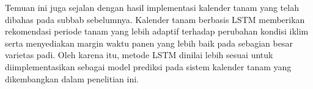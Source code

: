 Temuan ini juga sejalan dengan hasil implementasi kalender tanam yang telah dibahas pada subbab sebelumnya. Kalender tanam berbasis LSTM memberikan rekomendasi periode tanam yang lebih adaptif terhadap perubahan kondisi iklim serta menyediakan margin waktu panen yang lebih baik pada sebagian besar varietas padi. Oleh karena itu, metode LSTM dinilai lebih sesuai untuk diimplementasikan sebagai model prediksi pada sistem kalender tanam yang dikembangkan dalam penelitian ini.

